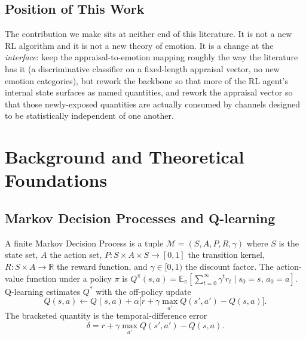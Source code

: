 \documentclass[conference]{IEEEtran}
\begin{document}
\subsection{Position of This Work}
The contribution we make sits at neither end of this literature. It is
not a new RL algorithm and it is not a new theory of emotion. It is a
change at the \emph{interface}: keep the appraisal-to-emotion mapping
roughly the way the literature has it (a discriminative classifier on a
fixed-length appraisal vector, no new emotion categories), but rework
the backbone so that more of the RL agent's internal state surfaces as
named quantities, and rework the appraisal vector so that those
newly-exposed quantities are actually consumed by channels designed to
be statistically independent of one another.

\section{Background and Theoretical Foundations}
\label{sec:background}

\subsection{Markov Decision Processes and Q-learning}
A finite Markov Decision Process is a tuple $\mathcal{M} = (S, A, P, R, \gamma)$
where $S$ is the state set, $A$ the action set,
$P : S \times A \times S \to [0, 1]$ the transition kernel, $R : S \times A
\to \mathbb{R}$ the reward function, and $\gamma \in [0, 1)$ the discount
factor. The action-value function under a policy $\pi$ is
$Q^{\pi}(s, a) = \mathbb{E}_{\pi}[\sum_{t=0}^{\infty} \gamma^{t} r_{t} \mid
s_{0}{=}s,\, a_{0}{=}a]$. Q-learning estimates $Q^{*}$ with the off-policy
update
\begin{equation}
Q(s, a) \leftarrow Q(s, a) + \alpha \big[ r + \gamma \max_{a'} Q(s', a') - Q(s, a) \big].
\label{eq:qlearn}
\end{equation}
The bracketed quantity is the temporal-difference error
\begin{equation}
\delta = r + \gamma \max_{a'} Q(s', a') - Q(s, a).
\label{eq:td}
\end{equation}
\end{document}
